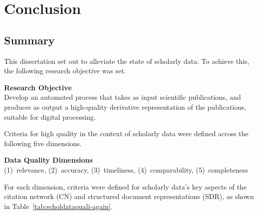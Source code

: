\chapter{Conclusion}
\label{chp:conclusion}

\section{Summary}

This dissertation set out to alleviate the state of scholarly data. To achieve this, the following research objective was set.

\begin{infobox-objective}
\textbf{Research Objective}\\
Develop an automated process that takes as input scientific publications, and produces as output a high-quality derivative representation of the publications, suitable for digital processing.
\end{infobox-objective}

Criteria for high quality in the context of scholarly data were defined across the following five dimensions.%

\begin{infobox-progress}
      \textbf{Data Quality Dimensions}\\
       (1)~relevance, (2)~accuracy, (3)~timeliness, (4)~comparability, (5)~completeness
\end{infobox-progress}

For each dimension, criteria were defined for scholarly data's key aspects of the citation network (CN) and structured document representations (SDR), as shown in Table~\ref{tab:scholdataquali-again}.


